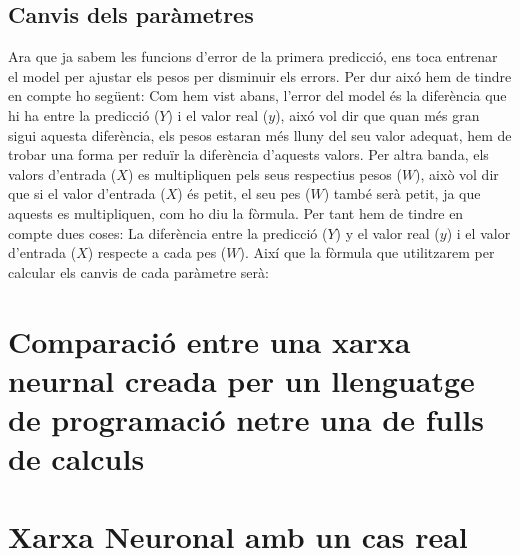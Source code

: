 \subsection{Canvis dels paràmetres}
Ara que ja sabem les funcions d'error de la primera predicció, ens toca entrenar el model per ajustar els pesos per disminuir els errors. Per dur aixó hem de tindre en compte ho següent: Com hem vist abans, l'error del model és la diferència que hi ha entre la predicció ($Y$) i el valor real ($y$), aixó vol dir que quan més gran sigui aquesta diferència, els pesos estaran més lluny del seu valor adequat, hem de trobar una forma per reduïr la diferència d'aquests valors.
Per altra banda, els valors d'entrada ($X$) es multipliquen pels seus respectius pesos ($W$), això vol dir que si el valor d'entrada ($X$) és petit, el seu pes ($W$) també serà petit, ja que aquests es multipliquen, com ho diu la fòrmula.
Per tant hem de tindre en compte dues coses: La diferència entre la predicció ($Y$) y el valor real ($y$) i el valor d'entrada ($X$) respecte a cada pes ($W$). Així que la fòrmula que utilitzarem per calcular els canvis de cada paràmetre serà:

\section{Comparació entre una xarxa neurnal creada per un llenguatge de programació netre una de fulls de calculs}

\section{Xarxa Neuronal amb un cas real}\label{sec:12}
